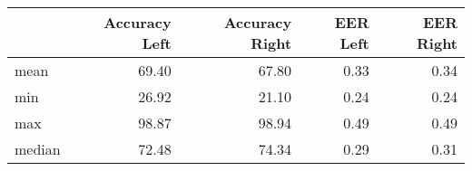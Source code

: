 \begin{tabular}{lrrrr}
\toprule
{} &  Accuracy Left &  Accuracy Right &  EER Left &  EER Right \\
\midrule
mean   &          69.40 &           67.80 &      0.33 &       0.34 \\
min    &          26.92 &           21.10 &      0.24 &       0.24 \\
max    &          98.87 &           98.94 &      0.49 &       0.49 \\
median &          72.48 &           74.34 &      0.29 &       0.31 \\
\bottomrule
\end{tabular}
